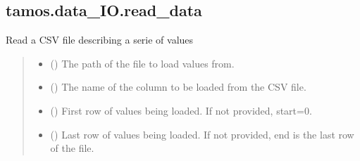 \documentclass[letterpaper,10pt,english]{sphinxmanual}
\begin{document}
\sphinxstepscope


\subsection{tamos.data\_IO.read\_data}
\label{\detokenize{generated/tamos.data_IO.read_data:tamos-data-io-read-data}}\label{\detokenize{generated/tamos.data_IO.read_data::doc}}

\begin{fulllineitems}
\label{\detokenize{generated/tamos.data_IO.read_data:tamos.data_IO.read_data}}
\pysigstartsignatures
{}
\pysigstopsignatures
\sphinxAtStartPar
Read a CSV file describing a serie of values
\begin{quote}\begin{description}
\begin{itemize}
\item {} 
\sphinxAtStartPar
{} () \textendash{} The path of the file to load values from.

\item {} 
\sphinxAtStartPar
{} (\sphinxstyleliteralemphasis{\sphinxupquote{, }}) \textendash{} The name of the column to be loaded from the CSV file.

\item {} 
\sphinxAtStartPar
{} (\sphinxstyleliteralemphasis{\sphinxupquote{, }}) \textendash{} First row of values being loaded.
If not provided, start=0.

\item {} 
\sphinxAtStartPar
{} (\sphinxstyleliteralemphasis{\sphinxupquote{, }}) \textendash{} Last row of values being loaded.
If not provided, end is the last row of the file.


\end{itemize}
\end{description}
\end{quote}
\end{fulllineitems}
\end{document}
